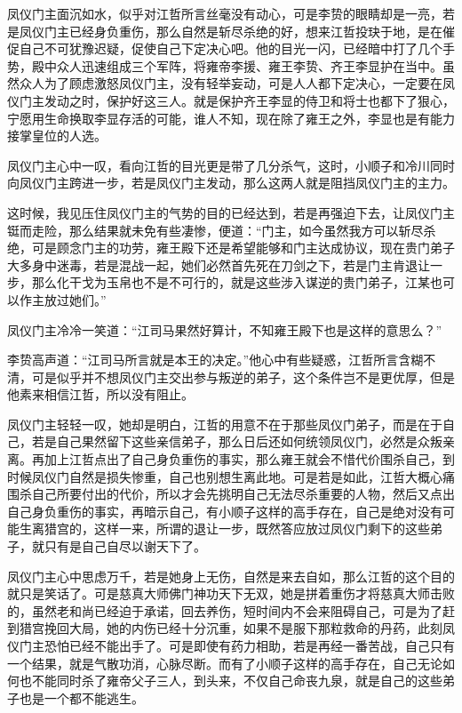 凤仪门主面沉如水，似乎对江哲所言丝毫没有动心，可是李贽的眼睛却是一亮，若是凤仪门主已经身负重伤，那么自然是斩尽杀绝的好，想来江哲投玦于地，是在催促自己不可犹豫迟疑，促使自己下定决心吧。他的目光一闪，已经暗中打了几个手势，殿中众人迅速组成三个军阵，将雍帝李援、雍王李贽、齐王李显护在当中。虽然众人为了顾虑激怒凤仪门主，没有轻举妄动，可是人人都下定决心，一定要在凤仪门主发动之时，保护好这三人。就是保护齐王李显的侍卫和将士也都下了狠心，宁愿用生命换取李显存活的可能，谁人不知，现在除了雍王之外，李显也是有能力接掌皇位的人选。

凤仪门主心中一叹，看向江哲的目光更是带了几分杀气，这时，小顺子和冷川同时向凤仪门主跨进一步，若是凤仪门主发动，那么这两人就是阻挡凤仪门主的主力。

这时候，我见压住凤仪门主的气势的目的已经达到，若是再强迫下去，让凤仪门主铤而走险，那么结果就未免有些凄惨，便道：“门主，如今虽然我方可以斩尽杀绝，可是顾念门主的功劳，雍王殿下还是希望能够和门主达成协议，现在贵门弟子大多身中迷毒，若是混战一起，她们必然首先死在刀剑之下，若是门主肯退让一步，那么化干戈为玉帛也不是不可行的，就是这些涉入谋逆的贵门弟子，江某也可以作主放过她们。”

凤仪门主冷冷一笑道：“江司马果然好算计，不知雍王殿下也是这样的意思么？”

李贽高声道：“江司马所言就是本王的决定。”他心中有些疑惑，江哲所言含糊不清，可是似乎并不想凤仪门主交出参与叛逆的弟子，这个条件岂不是更优厚，但是他素来相信江哲，所以没有阻止。

凤仪门主轻轻一叹，她却是明白，江哲的用意不在于那些凤仪门弟子，而是在于自己，若是自己果然留下这些亲信弟子，那么日后还如何统领凤仪门，必然是众叛亲离。再加上江哲点出了自己身负重伤的事实，那么雍王就会不惜代价围杀自己，到时候凤仪门自然是损失惨重，自己也别想生离此地。可是若是如此，江哲大概心痛围杀自己所要付出的代价，所以才会先挑明自己无法尽杀重要的人物，然后又点出自己身负重伤的事实，再暗示自己，有小顺子这样的高手存在，自己是绝对没有可能生离猎宫的，这样一来，所谓的退让一步，既然答应放过凤仪门剩下的这些弟子，就只有是自己自尽以谢天下了。

凤仪门主心中思虑万千，若是她身上无伤，自然是来去自如，那么江哲的这个目的就只是笑话了。可是慈真大师佛门神功天下无双，她是拼着重伤才将慈真大师击败的，虽然老和尚已经迫于承诺，回去养伤，短时间内不会来阻碍自己，可是为了赶到猎宫挽回大局，她的内伤已经十分沉重，如果不是服下那粒救命的丹药，此刻凤仪门主恐怕已经不能出手了。可是即使有药力相助，若是再经一番苦战，自己只有一个结果，就是气散功消，心脉尽断。而有了小顺子这样的高手存在，自己无论如何也不能同时杀了雍帝父子三人，到头来，不仅自己命丧九泉，就是自己的这些弟子也是一个都不能逃生。

